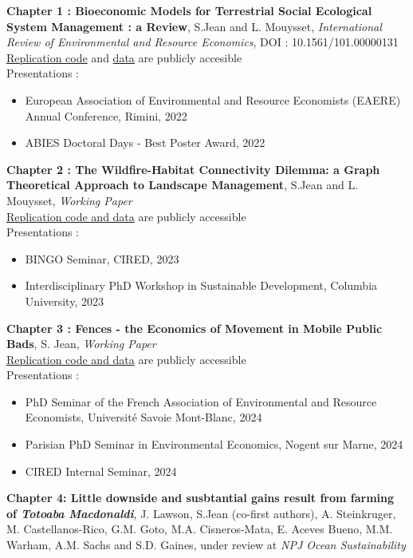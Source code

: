 \begin{displayquote}
\begin{displayquote}
\begin{displayquote}
{{{\textbf{Chapter 1 :  Bioeconomic Models for Terrestrial Social Ecological System Management : a Review}, S.Jean and L. Mouysset, \textit{International Review of Environmental and Resource Economics},
 DOI : 10.1561/101.00000131\\
\href{https://github.com/sim-jean/review-irere}{Replication code} and \href{https://zenodo.org/records/6656433}{data} are publicly accesible
\\
 Presentations : 
\begin{itemize}
\item European Association of Environmental and Resource Economists (EAERE) Annual Conference, Rimini, 2022
\item ABIES Doctoral Days - Best Poster Award, 2022
\end{itemize}
%
\textbf{Chapter 2 : The Wildfire-Habitat Connectivity Dilemma: a Graph Theoretical Approach to Landscape Management}, S.Jean and L. Mouysset, \textit{Working Paper}\\
\href{https://github.com/sim-jean/Landscape_connectivity_dilemma}{Replication code and data} are publicly accessible
%
\\
Presentations : 
\begin{itemize}
\item BINGO Seminar, CIRED, 2023
\item Interdisciplinary PhD Workshop in Sustainable Development, Columbia University, 2023
\end{itemize}
%
\textbf{Chapter 3 : Fences - the Economics of Movement in Mobile Public Bads}, S. Jean, \textit{Working Paper}\\
\href{https://github.com/sim-jean/fences}{Replication code and data} are publicly accessible
\\
Presentations : 
\begin{itemize}
\item PhD Seminar of the French Association of Environmental and Resource Economists, Université Savoie Mont-Blanc, 2024
\item Parisian PhD Seminar in Environmental Economics, Nogent sur Marne, 2024
\item CIRED Internal Seminar, 2024
\end{itemize}
%
\textbf{Chapter 4: Little downside and susbtantial gains result from farming of \textit{Totoaba Macdonaldi}}, J. Lawson, S.Jean (co-first authors), A. Steinkruger, M. Castellanos-Rico, G.M. Goto, M.A. Cisneros-Mata, E. Aceves Bueno, M.M. Warham, A.M. Sachs and S.D. Gaines,  under review at \textit{NPJ Ocean Sustainability}\\
}}}
\end{displayquote}
\end{displayquote}
\end{displayquote}
